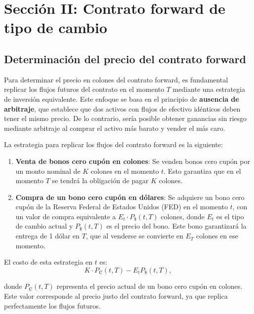\documentclass[12pt]{article}
\begin{document}
\newpage
\section{Sección II: Contrato forward de tipo de cambio}


\subsection{Determinación del precio del contrato forward}

Para determinar el precio en colones del contrato forward, es fundamental replicar los flujos futuros del contrato en el momento \( T \) mediante una estrategia de inversión equivalente. Este enfoque se basa en el principio de \textbf{ausencia de arbitraje}, que establece que dos activos con flujos de efectivo idénticos deben tener el mismo precio. De lo contrario, sería posible obtener ganancias sin riesgo mediante arbitraje al comprar el activo más barato y vender el más caro.

La estrategia para replicar los flujos del contrato forward es la siguiente:

\begin{enumerate}
    \item \textbf{Venta de bonos cero cupón en colones}: Se venden bonos cero cupón por un monto nominal de \( K \) colones en el momento \( t \). Esto garantiza que en el momento \( T \) se tendrá la obligación de pagar \( K \) colones.
    \item \textbf{Compra de un bono cero cupón en dólares}: Se adquiere un bono cero cupón de la Reserva Federal de Estados Unidos (FED) en el momento \( t \), con un valor de compra equivalente a \( E_t \cdot P_{\text{\$}}(t, T) \) colones, donde \( E_t \) es el tipo de cambio actual y \( P_{\text{\$}}(t, T) \) es el precio del bono. Este bono garantizará la entrega de 1 dólar en \( T \), que al venderse se convierte en \( E_T \) colones en ese momento.
\end{enumerate}

El costo de esta estrategia en \( t \) es:
\[ K \cdot P_{\text{₡}}(t, T) - E_t P_{\text{\$}}(t, T), \]

donde \( P_{\text{₡}}(t, T) \) representa el precio actual de un bono cero cupón en colones. Este valor corresponde al precio justo del contrato forward, ya que replica perfectamente los flujos futuros.
\end{document}
